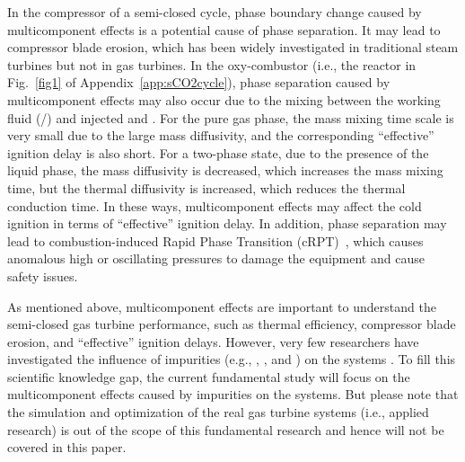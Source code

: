 In the compressor of a semi-closed  cycle, phase boundary change caused by multicomponent effects is a potential cause of phase separation. It may lead to compressor blade erosion, which has been widely investigated in traditional steam turbines \cite{ahmad2009experimental} but not in  gas turbines. %
In the  oxy-combustor (i.e., the reactor in Fig.~\ref{fig1} of Appendix~\ref{app:sCO2cycle}), phase separation caused by multicomponent effects may also occur due to the mixing between the working fluid (/) and injected  and . For the pure gas phase, the mass mixing time scale is very small due to the large mass diffusivity, and the corresponding ``effective'' ignition delay is also short. For a two-phase state, due to the presence of the liquid phase, the mass diffusivity is decreased, which increases the mass mixing time, but the thermal diffusivity is increased, which reduces the thermal conduction time. In these ways, multicomponent effects may affect the cold ignition in terms of ``effective'' ignition delay. In addition, phase separation may lead to combustion-induced Rapid Phase Transition (cRPT)~\citep{basco2013effect}, which causes anomalous high or oscillating pressures to damage the equipment and cause safety issues.%

As mentioned above, multicomponent effects are important to understand the semi-closed  gas turbine performance, such as thermal efficiency, compressor blade erosion, and ``effective'' ignition delays. However, very few researchers have investigated the influence of impurities (e.g., , , and ) on the  systems \cite{vesely2019effect,pint2018effect}. 
To fill this scientific knowledge gap, the current fundamental study will focus on the multicomponent effects caused by impurities on the  systems. %
But please note that the simulation and optimization of the real  gas turbine systems (i.e., applied research) is out of the scope of this fundamental research and hence will not be covered in this paper.

